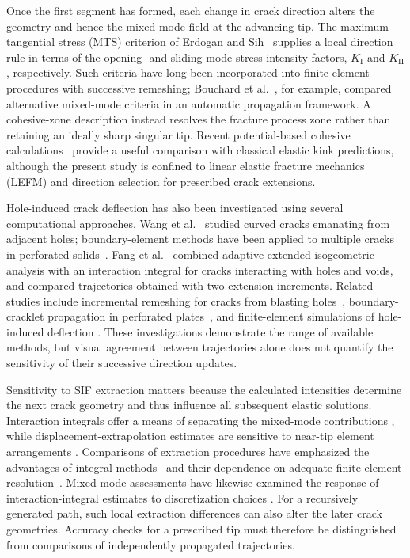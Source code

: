 \documentclass[11pt]{article}
\begin{document}
Once the first segment has formed, each change in crack direction
alters the geometry and hence the mixed-mode field at the advancing
tip. The maximum tangential stress (MTS) criterion of Erdogan and
Sih~\cite{ErdoganSih1963} supplies a local direction rule in terms of
the opening- and sliding-mode stress-intensity factors,
$K_{\mathrm{I}}$ and $K_{\mathrm{II}}$, respectively. Such criteria
have long been incorporated into finite-element procedures with
successive remeshing; Bouchard et al.~\cite{BouchardEtAl2003},
for example, compared alternative mixed-mode criteria in an
automatic propagation framework. A cohesive-zone description
instead resolves the fracture process zone rather than retaining
an ideally sharp singular tip. Recent potential-based cohesive
calculations~\cite{BogdanovSelivanov2026} provide a useful
comparison with classical elastic kink predictions, although the
present study is confined to linear elastic fracture mechanics
(LEFM) and direction selection for prescribed crack extensions.

Hole-induced crack deflection has also been investigated using
several computational approaches. Wang et al.~\cite{WangMeguidPapanikos1999}
studied curved cracks emanating from adjacent holes; boundary-element
methods have been applied to multiple cracks in perforated
solids~\cite{LiuLiXie2017}. Fang et al.~\cite{FangEtAl2020}
combined adaptive extended isogeometric analysis with an
interaction integral for cracks interacting with holes and voids,
and compared trajectories obtained with two extension increments.
Related studies include incremental remeshing for cracks from
blasting holes~\cite{YangEtAl2020}, boundary-cracklet
propagation in perforated plates~\cite{AhmedEtAl2021}, and
finite-element simulations of hole-induced deflection
\cite{AlshoaibiFageehi2022}. These investigations demonstrate
the range of available methods, but visual agreement between
trajectories alone does not quantify the sensitivity of their
successive direction updates.

Sensitivity to SIF extraction matters because the calculated
intensities determine the next crack geometry and thus influence
all subsequent elastic solutions. Interaction integrals offer
a means of separating the mixed-mode contributions
\cite{YauWangCorten1980}, while displacement-extrapolation
estimates are sensitive to near-tip element arrangements
\cite{GuineaPlanasElices2000}. Comparisons of extraction
procedures have emphasized the advantages of integral
methods~\cite{CourtinEtAl2005} and their dependence on
adequate finite-element resolution~\cite{QianEtAl2016}.
Mixed-mode assessments have likewise examined the response
of interaction-integral estimates to discretization choices
\cite{GhafooriAhangarVerreman2019}. For a recursively generated
path, such local extraction differences can also alter the
later crack geometries. Accuracy checks for a prescribed tip
must therefore be distinguished from comparisons of
independently propagated trajectories.
\end{document}
